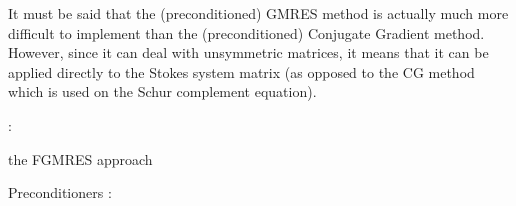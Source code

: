 It must be said that the (preconditioned) GMRES method is actually much more difficult to implement 
than the (preconditioned) Conjugate Gradient method.
However, since it can deal with unsymmetric matrices, it means that it can be applied 
directly to the Stokes system matrix (as opposed to the CG method which is used on the Schur complement
equation).

 

\Literature: \cite[p208]{eijkhout} \cite{saad,saad93} \cite{babc94} \cite{ayac03}







 










the FGMRES approach \cite{deit13}


\Literature \cite{pasa75,mamo08,fumt11,knke04,kool00,kopo93} \cite{lane18}

Preconditioners \Literature: \cite{seuv10}
